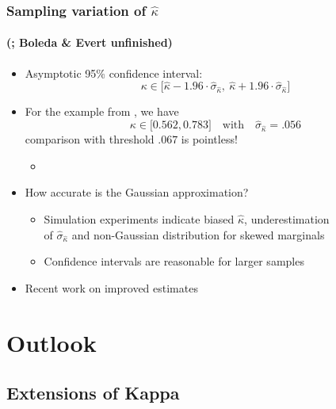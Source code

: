 \documentclass[t]{beamer} %
\begin{document}
\begin{frame}
  \frametitle{Sampling variation of $\hat{\kappa}$}
  \framesubtitle{(\citealt{Lee:Tu:94};  Boleda \& Evert unfinished)}

  \begin{itemize}
  \item<1-> Asymptotic 95\% confidence interval:
    \[
    \kappa\in \bigl[
    \hat{\kappa} - 1.96\cdot \hat{\sigma}_{\hat{\kappa}},\: 
    \hat{\kappa} + 1.96\cdot \hat{\sigma}_{\hat{\kappa}}
    \bigr]
    \]
  \item<2-> For the example from \citet{DiEugenio:Glass:04}, we have
    \[
    \kappa\in \bigl[ 0.562, 0.783 \bigr] 
    \quad \text{with} \quad
    \hat{\sigma}_{\hat{\kappa}} = .056
    \]
    \So comparison with threshold $.067$ is pointless!
    \begin{itemize}
    \item[]
    \end{itemize}
  \item<3-> How accurate is the Gaussian approximation?
    \begin{itemize}
    \item Simulation experiments indicate biased $\hat{\kappa}$,
      underestimation\\ of $\hat{\sigma}_{\hat{\kappa}}$ and non-Gaussian
      distribution for skewed marginals
    \item Confidence intervals are reasonable for larger samples 
    \end{itemize}
  \item<4-> Recent work on improved estimates \citep[e.g.][]{Lee:Tu:94}
  \end{itemize}
\end{frame}

\section{Outlook}

\subsection{Extensions of Kappa}
\end{document}
